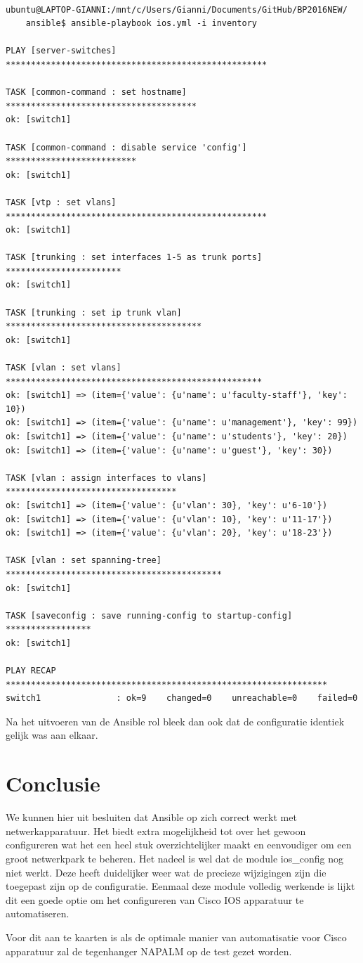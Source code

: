 \begin{center}
\begin{BVerbatim}

ubuntu@LAPTOP-GIANNI:/mnt/c/Users/Gianni/Documents/GitHub/BP2016NEW/
    ansible$ ansible-playbook ios.yml -i inventory

PLAY [server-switches] ****************************************************

TASK [common-command : set hostname] **************************************
ok: [switch1]

TASK [common-command : disable service 'config'] **************************
ok: [switch1]

TASK [vtp : set vlans] ****************************************************
ok: [switch1]

TASK [trunking : set interfaces 1-5 as trunk ports] ***********************
ok: [switch1]

TASK [trunking : set ip trunk vlan] ***************************************
ok: [switch1]

TASK [vlan : set vlans] ***************************************************
ok: [switch1] => (item={'value': {u'name': u'faculty-staff'}, 'key': 10})
ok: [switch1] => (item={'value': {u'name': u'management'}, 'key': 99})
ok: [switch1] => (item={'value': {u'name': u'students'}, 'key': 20})
ok: [switch1] => (item={'value': {u'name': u'guest'}, 'key': 30})

TASK [vlan : assign interfaces to vlans] **********************************
ok: [switch1] => (item={'value': {u'vlan': 30}, 'key': u'6-10'})
ok: [switch1] => (item={'value': {u'vlan': 10}, 'key': u'11-17'})
ok: [switch1] => (item={'value': {u'vlan': 20}, 'key': u'18-23'})

TASK [vlan : set spanning-tree] *******************************************
ok: [switch1]

TASK [saveconfig : save running-config to startup-config] *****************
ok: [switch1]

PLAY RECAP ****************************************************************
switch1               : ok=9    changed=0    unreachable=0    failed=0

\end{BVerbatim}
\end{center}

Na het uitvoeren van de Ansible rol bleek dan ook dat de configuratie identiek gelijk was aan elkaar. 

\section{Conclusie}
\label{ch:ansibleconclusion}
We kunnen hier uit besluiten dat Ansible op zich correct werkt met netwerkapparatuur. Het biedt extra mogelijkheid tot over het gewoon configureren wat het een heel stuk overzichtelijker maakt en eenvoudiger om een groot netwerkpark te beheren. Het nadeel is wel dat de module ios\_config nog niet werkt. Deze heeft duidelijker weer wat de precieze wijzigingen zijn die toegepast zijn op de configuratie. Eenmaal deze module volledig werkende is lijkt dit een goede optie om het configureren van Cisco IOS apparatuur te automatiseren.

Voor dit aan te kaarten is als de optimale manier van automatisatie voor Cisco apparatuur zal de tegenhanger NAPALM op de test gezet worden.